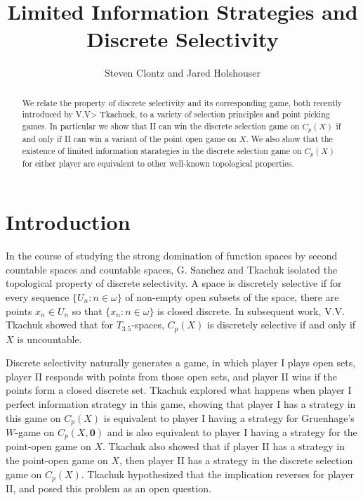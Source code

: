 \documentclass{amsart}
\theoremstyle{plain}
\theoremstyle{definition}
\theoremstyle{remark}
\theoremstyle{plain}
\theoremstyle{definition}
\theoremstyle{remark}
\begin{document}
\title{Limited Information Strategies and Discrete Selectivity}
\author{Steven Clontz and Jared Holshouser}
\address{Department of Mathematics and Statistics,
The University of South Alabama,
Mobile, AL 36688}



\begin{abstract}
 We relate the property of discrete selectivity and its corresponding game, both recently introduced by V.V> Tkachuck, to a variety of selection principles and point picking games. In particular we show that II can win the discrete selection game on \(C_p(X)\) if and only if II can win a variant of the point open game on \(X\). We also show that the existence of limited information starategies in the discrete selection game on \(C_p(X)\) for either player are equivalent to other well-known topological properties.
\end{abstract}

\maketitle

\section{Introduction}

In the course of studying the strong domination of function spaces by second countable spaces and countable spaces, G. Sanchez and Tkachuk isolated the topological property of discrete selectivity.
A space is discretely selective if for every sequence \(\{U_n : n \in \omega\}\) of non-empty open subsets of the space, there are points \(x_n \in U_n\) so that \(\{x_n : n \in \omega\}\) is closed discrete.
In subsequent work, V.V. Tkachuk showed that for \(T_{3.5}\)-spaces, \(C_p(X)\) is discretely selective if and only if \(X\) is uncountable.

Discrete selectivity naturally generates a game, in which player I plays open sets, player II responds with points from those open sets, and player II wins if the points form a closed discrete set.
Tkachuk explored what happens when player I  perfect information strategy in this game, showing that player I has a strategy in this game on \(C_p(X)\) is equivalent to player I having a strategy for Gruenhage's \(W\)-game on \(C_p(X,\mathbf 0)\) and is also equivalent to player I having a strategy for the point-open game on \(X\).
Tkachuk also showed that if player II has a strategy in the point-open game on \(X\), then player II has a strategy in the discrete selection game on \(C_p(X)\).
Tkachuk hypothesized that the implication reverses for player II, and posed this problem as an open question.
\end{document}
